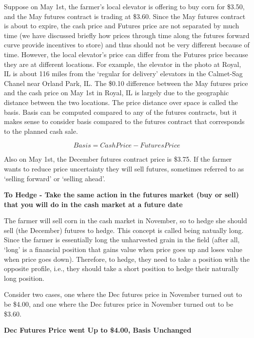 \documentclass[
  letterpaper,
  DIV=11,
  numbers=noendperiod]{scrreprt}
\begin{document}
Suppose on May 1st, the farmer's local elevator is offering to buy corn
for \$3.50, and the May futures contract is trading at \$3.60. Since the
May futures contract is about to expire, the cash price and Futures
price are not separated by much time (we have discussed briefly how
prices through time along the futures forward curve provide incentives
to store) and thus should not be very different because of time.
However, the local elevator's price can differ from the Futures price
because they are at different locations. For example, the elevator in
the photo at Royal, IL is about 116 miles from the `regular for
delivery' elevators in the Calmet-Sag Chanel near Orland Park, IL. The
\$0.10 difference between the May futures price and the cash price on
May 1st in Royal, IL is largely due to the geographic distance between
the two locations. The price distance over space is called the basis.
Basis can be computed compared to any of the futures contracts, but it
makes sense to consider basis compared to the futures contract that
corresponds to the planned cash sale.

\[Basis = Cash Price - Futures Price\]

Also on May 1st, the December futures contract price is \$3.75. If the
farmer wants to reduce price uncertainty they will sell futures,
sometimes referred to as `selling forward' or `selling ahead'.

\textbf{To Hedge - Take the same action in the futures market (buy or
sell) that you will do in the cash market at a future date}

The farmer will sell corn in the cash market in November, so to hedge
she should sell (the December) futures to hedge. This concept is called
being natually long. Since the farmer is essentially long the
unharvested grain in the field (after all, `long' is a financial
position that gains value when price goes up and loses value when price
goes down). Therefore, to hedge, they need to take a position with the
opposite profile, i.e., they should take a short position to hedge their
naturally long position.

Consider two cases, one where the Dec futures price in November turned
out to be \$4.00, and one where the Dec futures price in November turned
out to be \$3.60.

\textbf{Dec Futures Price went Up to \$4.00, Basis Unchanged}
\end{document}
